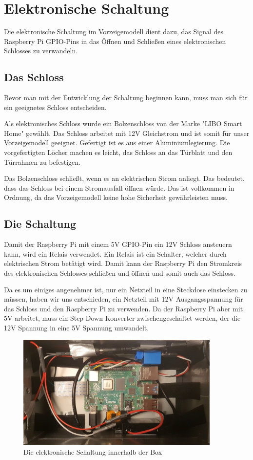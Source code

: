 \chapter{Elektronische Schaltung}
Die elektronische Schaltung im Vorzeigemodell dient dazu, das Signal
des Raspberry Pi GPIO-Pins in das Öffnen und Schließen eines elektronischen Schlosses
zu verwandeln.

\section{Das Schloss}
Bevor man mit der Entwicklung der Schaltung beginnen kann, muss man sich für ein geeignetes
Schloss entscheiden.

Als elektronisches Schloss wurde ein Bolzenschloss von der Marke "LIBO Smart Home" gewählt.
Das Schloss arbeitet mit 12V Gleichstrom und ist somit für unser Vorzeigemodell geeignet. Gefertigt
ist es aus einer Aluminiumlegierung. Die vorgefertigten Löcher machen es leicht, das Schloss an das
Türblatt und den Türrahmen zu befestigen.

Das Bolzenschloss schließt, wenn es an elektrischen Strom anliegt. Das bedeutet, dass das Schloss
bei einem Stromausfall öffnen würde. Das ist vollkommen in Ordnung, da das Vorzeigemodell
keine hohe Sicherheit gewährleisten muss.

\section{Die Schaltung}
Damit der Raspberry Pi mit einem 5V GPIO-Pin ein 12V Schloss ansteuern kann, wird ein Relais verwendet.
Ein Relais ist ein Schalter, welcher durch elektrischen Strom betätigt wird. Damit kann der Raspberry Pi
den Stromkreis des elektronischen Schlosses schließen und öffnen und somit auch das Schloss.

Da es um einiges angenehmer ist, nur ein Netzteil in eine Steckdose einstecken zu müssen, haben wir uns entschieden, ein
Netzteil mit 12V Ausgangsspannung für das Schloss und den Raspberry Pi zu verwenden. Da der Raspberry Pi
aber mit 5V arbeitet, muss ein Step-Down-Konverter zwischengeschaltet werden, der die 12V Spannung in eine 5V Spannung umwandelt.

\begin{figure}[H]
    \begin{center}
        \includegraphics[width=0.9\textwidth]{images/core/schaltung.jpg}
        \caption{Die elektronische Schaltung innerhalb der Box}
    \end{center}
\end{figure}